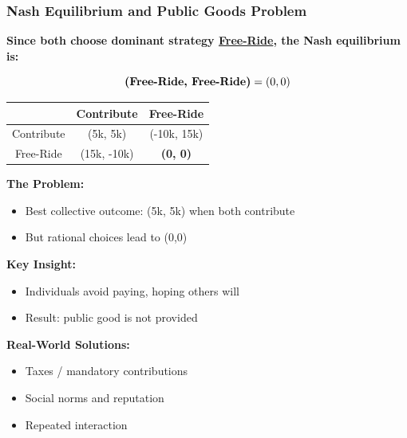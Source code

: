 \begin{frame}[fragile]\frametitle{Nash Equilibrium and Public Goods Problem}

\textbf{Since both choose dominant strategy \underline{Free-Ride}, the Nash equilibrium is:}

\[
\textbf{(Free\text{-}Ride,\ Free\text{-}Ride)} = (0, 0)
\]

\vspace{6pt}

\begin{center}
\begin{tabular}{|c|c|c|}
  \hline
  & Contribute & Free-Ride \\
  \hline
  Contribute & (5k, 5k) & (-10k, 15k) \\
  \hline
  Free-Ride & (15k, -10k) & \textbf{(0, 0)} \\
  \hline
\end{tabular}
\end{center}

\vspace{6pt}

\textbf{The Problem:}

\begin{itemize}
  \item Best collective outcome: (5k, 5k) when both contribute
  \item But rational choices lead to (0,0)
\end{itemize}

\vspace{6pt}

\textbf{Key Insight:}
\begin{itemize}
  \item Individuals avoid paying, hoping others will
  \item Result: public good is not provided
\end{itemize}

\vspace{6pt}

\textbf{Real-World Solutions:}
\begin{itemize}
  \item Taxes / mandatory contributions
  \item Social norms and reputation
  \item Repeated interaction
\end{itemize}

\end{frame}



